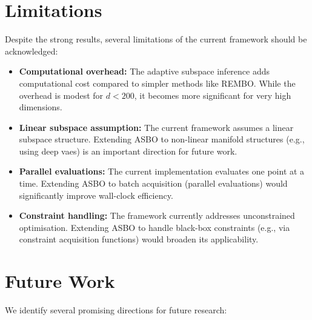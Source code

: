\section{Limitations}
\label{sec:limitations}

Despite the strong results, several limitations of the current framework should
be acknowledged:

\begin{itemize}
    \item \textbf{Computational overhead:} The adaptive subspace inference adds
    computational cost compared to simpler methods like REMBO.  While the
    overhead is modest for $d < 200$, it becomes more significant for very high
    dimensions.

    \item \textbf{Linear subspace assumption:} The current framework assumes a
    linear subspace structure.  Extending ASBO to non-linear manifold
    structures (e.g., using deep \glspl{vae}) is an important direction for
    future work.

    \item \textbf{Parallel evaluations:} The current implementation evaluates
    one point at a time.  Extending ASBO to batch acquisition (parallel
    evaluations) would significantly improve wall-clock efficiency.

    \item \textbf{Constraint handling:} The framework currently addresses
    unconstrained optimisation.  Extending ASBO to handle black-box constraints
    (e.g., via constraint acquisition functions) would broaden its applicability.
\end{itemize}

\section{Future Work}
\label{sec:future-work}

We identify several promising directions for future research:

